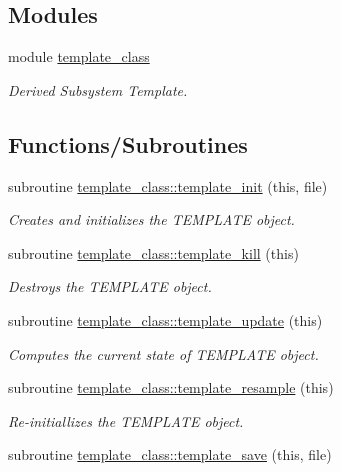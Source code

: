 \subsection*{Modules}
\begin{DoxyCompactItemize}
\item 
module \hyperlink{namespacetemplate__class}{template\+\_\+class}
\begin{DoxyCompactList}\small\item\em Derived Subsystem Template. \end{DoxyCompactList}\end{DoxyCompactItemize}
\subsection*{Functions/\+Subroutines}
\begin{DoxyCompactItemize}
\item 
subroutine \hyperlink{namespacetemplate__class_afada03bed94ed0e30fc64e11fdc5d129}{template\+\_\+class\+::template\+\_\+init} (this, file)
\begin{DoxyCompactList}\small\item\em Creates and initializes the T\+E\+M\+P\+L\+A\+TE object. \end{DoxyCompactList}\item 
subroutine \hyperlink{namespacetemplate__class_a366839a54d53b1b42596fcb6979c49e3}{template\+\_\+class\+::template\+\_\+kill} (this)
\begin{DoxyCompactList}\small\item\em Destroys the T\+E\+M\+P\+L\+A\+TE object. \end{DoxyCompactList}\item 
subroutine \hyperlink{namespacetemplate__class_ab9e51260f15fea473f62d16c07329252}{template\+\_\+class\+::template\+\_\+update} (this)
\begin{DoxyCompactList}\small\item\em Computes the current state of T\+E\+M\+P\+L\+A\+TE object. \end{DoxyCompactList}\item 
subroutine \hyperlink{namespacetemplate__class_ad296ef0f288e19f326fd85ec615223cf}{template\+\_\+class\+::template\+\_\+resample} (this)
\begin{DoxyCompactList}\small\item\em Re-\/initiallizes the T\+E\+M\+P\+L\+A\+TE object. \end{DoxyCompactList}\item 
subroutine \hyperlink{namespacetemplate__class_a35aadd43e518eec1e9fab596d018441c}{template\+\_\+class\+::template\+\_\+save} (this, file)

\end{DoxyCompactItemize}
